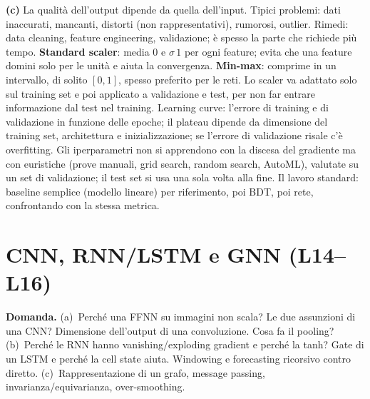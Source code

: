 \documentclass[11pt,a4paper]{article}
\newcommand{\Dom}[1]{\par\medskip\noindent\textbf{Domanda.} #1\par\nopagebreak}
\begin{document}
{\textbf{(c)} La qualit\`a dell'output dipende da quella dell'input. Tipici problemi: dati inaccurati, mancanti, distorti (non rappresentativi), rumorosi, outlier. Rimedi: data cleaning, feature engineering, validazione; \`e spesso la parte che richiede pi\`u tempo.
\textbf{Standard scaler}: media $0$ e $\sigma\,1$ per ogni feature; evita che una feature domini solo per le unit\`a e aiuta la convergenza. \textbf{Min-max}: comprime in un intervallo, di solito $[0,1]$, spesso preferito per le reti.
Lo scaler va adattato solo sul training set e poi applicato a validazione e test, per non far entrare informazione dal test nel training.
Learning curve: l'errore di training e di validazione in funzione delle epoche; il plateau dipende da dimensione del training set, architettura e inizializzazione; se l'errore di validazione risale c'\`e overfitting.
Gli iperparametri non si apprendono con la discesa del gradiente ma con euristiche (prove manuali, grid search, random search, AutoML), valutate su un set di validazione; il test set si usa una sola volta alla fine.
Il lavoro standard: baseline semplice (modello lineare) per riferimento, poi BDT, poi rete, confrontando con la stessa metrica.
}

\section{CNN, RNN/LSTM e GNN (L14--L16)}

\Dom{(a)~Perch\'e una FFNN su immagini non scala? Le due assunzioni di una CNN? Dimensione dell'output di una convoluzione. Cosa fa il pooling?
(b)~Perch\'e le RNN hanno vanishing/exploding gradient e perch\'e la tanh? Gate di un LSTM e perch\'e la cell state aiuta. Windowing e forecasting ricorsivo contro diretto.
(c)~Rappresentazione di un grafo, message passing, invarianza/equivarianza, over-smoothing.}
\end{document}
